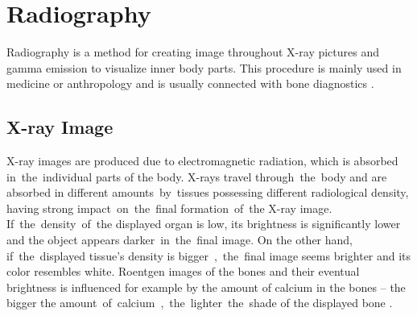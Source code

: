 \section{Radiography}
Radiography is a method for creating image throughout X-ray pictures and gamma emission to visualize inner body parts. This procedure is mainly used in medicine or anthropology and is usually connected with bone diagnostics \cite{radiography}.

\subsection{X-ray Image}
X-ray images are produced due to electromagnetic radiation, which is absorbed in~the~individual parts of the body. X-rays travel through~the~body and are absorbed in different amounts~by~tissues possessing different radiological density, having strong impact~on~the~final formation~of~the X-ray image. If~the~density~of~the displayed organ is low, its brightness is significantly lower and the object appears darker~in~the~final image. On the other hand, if~the~displayed tissue's density is bigger~,~the~final image seems brighter and its color resembles white. Roentgen images of the bones and their eventual brightness is influenced for example by the amount of calcium in the bones – the bigger the amount~of~calcium~,~the~lighter~the~shade of the displayed bone \cite{x-ray, x-ray-colors}.

